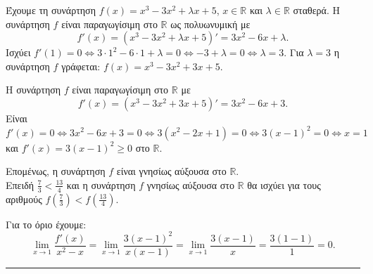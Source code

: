 \begin{alist}
    \item  Έχουμε τη συνάρτηση $f(x) = x^3 - 3x^2 + \lambda x + 5$, $x \in \mathbb{R}$ και $\lambda \in \mathbb{R}$ σταθερά.
    Η συνάρτηση $f$ είναι παραγωγίσιμη στο $\mathbb{R}$ ως πολυωνυμική με
    \[
        f'(x) = (x^3 - 3x^2 + \lambda x + 5)' = 3x^2 - 6x + \lambda.
    \]
    Ισχύει $f'(1) = 0 \Leftrightarrow 3 \cdot 1^2 - 6 \cdot 1 + \lambda = 0 \Leftrightarrow -3 + \lambda = 0 \Leftrightarrow \lambda = 3$.
    Για $\lambda = 3$ η συνάρτηση $f$ γράφεται: $f(x) = x^3 - 3x^2 + 3x + 5$.

    \item  Η συνάρτηση $f$ είναι παραγωγίσιμη στο $\mathbb{R}$ με
    \[
        f'(x) = (x^3 - 3x^2 + 3x + 5)' = 3x^2 - 6x + 3.
    \]
    Είναι $f'(x) = 0 \Leftrightarrow 3x^2 - 6x + 3 = 0 \Leftrightarrow 3(x^2 - 2x + 1) = 0 \Leftrightarrow 3(x - 1)^2 = 0 \Leftrightarrow x = 1$ και $f'(x) = 3(x - 1)^2 \geq 0$ στο $\mathbb{R}$.
    \begin{center}
    \end{center}
    Επομένως, η συνάρτηση $f$ είναι γνησίως αύξουσα στο $\mathbb{R}$.\\
    Επειδή $\frac{7}{3} < \frac{13}{4}$ και η συνάρτηση $f$ γνησίως αύξουσα στο $\mathbb{R}$ θα ισχύει για τους αριθμούς $f\left(\frac{7}{3}\right) < f\left(\frac{13}{4}\right)$.

    \item  Για το όριο έχουμε:
    \[
        \lim\limits_{x\to1} \frac{f'(x)}{x^2 - x} = \lim\limits_{x\to1} \frac{3(x - 1)^2}{x(x - 1)} = \lim\limits_{x\to1} \frac{3(x - 1)}{x} = \frac{3(1 - 1)}{1} = 0.
    \]
\end{alist}
\vspace{6mm}
\noindent\rule{\textwidth}{0.4pt}
\vspace{6mm}

